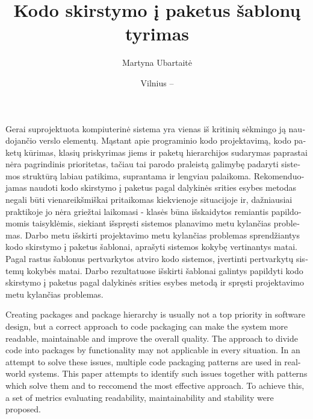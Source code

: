 \documentclass[
]{VUMIFPSbakalaurinis}
\title{Kodo skirstymo į paketus šablonų tyrimas}
\author{Martyna Ubartaitė}
\date{Vilnius – \the\year}
\begin{document}
\maketitle


\begin{lithuanian}
Gerai suprojektuota kompiuterinė sistema yra vienas iš kritinių sėkmingo ją naudojančio verslo
elementų.
Mąstant apie programinio kodo
projektavimą, kodo paketų kūrimas, klasių priskyrimas jiems ir paketų hierarchijos sudarymas paprastai
nėra pagrindinis prioritetas, tačiau tai parodo praleistą galimybę padaryti sistemos struktūrą labiau
patikima, suprantama ir lengviau palaikoma.
Rekomenduojamas naudoti kodo skirstymo į paketus pagal dalykinės srities esybes metodas negali būti vienareikšmiškai pritaikomas
kiekvienoje situacijoje ir, dažniausiai praktikoje jo nėra griežtai laikomasi - klasės būna išskaidytos remiantis papildomomis taisyklėmis,
siekiant išspręsti sistemos planavimo metu kylančias problemas.
Darbo metu išskirti projektavimo metu kylančias problemas sprendžiantys kodo skirstymo į paketus šablonai, aprašyti sistemos
kokybę vertinantys matai.
Pagal rastus šablonus pertvarkytos atviro kodo sistemos, įvertinti pertvarkytų sistemų kokybės matai.
Darbo rezultatuose išskirti šablonai galintys papildyti kodo skirstymo į paketus pagal dalykinės srities esybes metodą ir spręsti
projektavimo metu kylančias problemas.

\end{lithuanian}

\begin{english}
Creating packages and package hierarchy is usually not a top priority in software design, but
a correct approach to code packaging can make the system more readable, maintainable and improve the overall quality.
The approach to divide code into packages by functionality may not applicable in every situation.
In an attempt to solve these issues, multiple code packaging patterns are used in real-world systems.
This paper attempts to identify such issues together with patterns which solve them and to reccomend the most effective approach.
To achieve this, a set of metrics evaluating readability, maintainability and stability were proposed.

\end{english}
\end{document}
